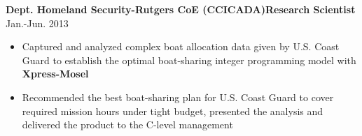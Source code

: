 \documentclass[10.5pt]{res} %
\begin{document}
\begin{resume}
    \textbf{%
    Dept. Homeland Security-Rutgers CoE (CCICADA)}\quad\textbf{Research Scientist}  \hfill Jan.-Jun. 2013
        \begin{itemize} pt
            \item Captured and analyzed complex boat allocation data given by U.S. Coast Guard to establish the optimal boat-sharing integer programming model with \textbf{Xpress-Mosel}%
            \item Recommended the best boat-sharing plan for U.S. Coast Guard to cover required mission hours under tight budget, presented the analysis and delivered the product to the C-level management %
        \end{itemize}\vspace{-\topsep}

\end{resume}
\end{document}
